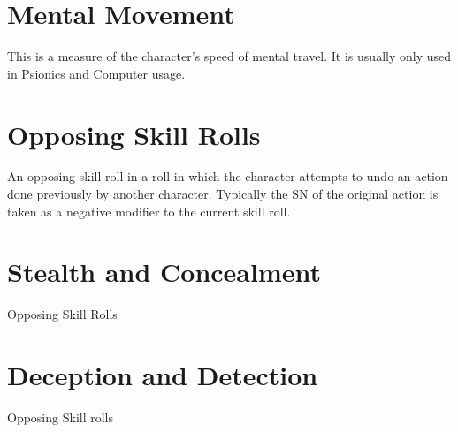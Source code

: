

\section{Mental Movement}
This is a measure of the character's speed of mental travel. It is 
usually only used in Psionics and Computer usage.

\section{Opposing Skill Rolls}

An opposing skill roll in a roll in which the character attempts to 
undo an action done previously by another character. Typically the SN 
of the original action is taken as a negative modifier to the current 
skill roll.

\section{Stealth and Concealment}

Opposing Skill Rolls

\section{Deception and Detection}

Opposing Skill rolls



